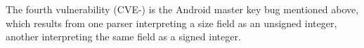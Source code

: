 The fourth vulnerability (CVE-\XXX) is the Android master key bug mentioned above, which results
from one parser interpreting a size field as an unsigned integer, another interpreting the same
field as a signed integer.







